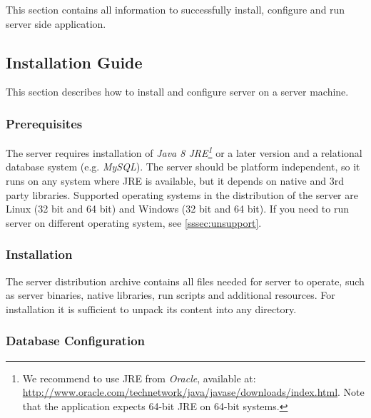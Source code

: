 
This section contains all information to successfully install, configure and run
\textan{} server side application.

\subsection{Installation Guide}

This section describes how to install and configure \textan{} server on a server
machine.

\subsubsection{Prerequisites}
\label{sssec:SerInstPre}

The \textan{} server requires installation of \emph{Java 8 JRE\footnote{We
recommend to use JRE from \emph{Oracle}, available at:
\url{http://www.oracle.com/technetwork/java/javase/downloads/index.html}.
Note that the application expects 64-bit JRE on 64-bit systems.}}
or a later version and a relational database system (e.g. \emph{MySQL}).
The server should be platform independent, so it runs on any system where JRE
is available, but it depends on native and 3rd party libraries. Supported operating
systems in the distribution of the \textan{} server are Linux (32 bit and 64 bit)
and Windows (32 bit and 64 bit).  If you need to run \textan{} server on
different operating system, see \ref{sssec:unsupport}.

\subsubsection{Installation}

The \textan{} server distribution archive contains all files needed for \textan{} server to operate,
such as server binaries, native libraries, run scripts and additional resources.
For installation it is sufficient to unpack its content into any directory.

\subsubsection{Database Configuration}


